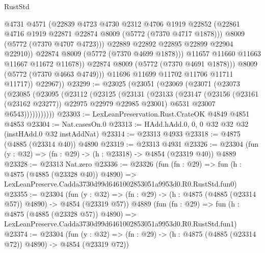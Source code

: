 \begin{lexlean}{RustStd}
\begin{coremodule}
                          @4731
                          @4571
                          (@22839
                            @4723
                            @4730
                            @2312
                            @4706
                            @1919
                            @22852
                            (@22861 @4716 @1919 @22871 @22874 @8009 (@5772 (@7370 @4717 @1878)))
                            @8009
                            (@5772 (@7370 @4707 @4723)))
                          @22889
                          @22892
                          @22895
                          @22899
                          @22904
                          @22910))
                      @22874
                      @8009
                      (@5772 (@7370 @4699 @1878)))
                    @11657
                    @11660
                    @11663
                    @11667
                    @11672
                    @11678))
                @22874
                @8009
                (@5772 (@7370 @4691 @1878)))
              @8009
              (@5772 (@7370 @4663 @4749)))
            @11696
            @11699
            @11702
            @11706
            @11711
            @11717))
        @22967))
@23299 := @23025
    (@23051
      (@23069
        (@23071
          (@23073
            (@23085
              (@23095
                (@23112
                  (@23125
                    (@23131
                      (@23133
                        (@23147
                          (@23156 (@23161 (@23162 @23277)) @22975 @22979 @22985 @23001)
                          @6531
                          @23007
                          @6543)))))))))))
@23303 := LexLeanPreservation.Rust.CrateOK @4849 @4851 @4853
@23304 := Nat.casesOn.{0}
@23313 := HAdd.hAdd.{0, 0, 0} @32 @32 @32 (instHAdd.{0} @32 instAddNat)
@23314 := @23313 @4933
@23318 := @4875 (@4885 (@23314 @40)) @4890
@23319 := @23313 @4931
@23326 := @23304 (fun (y : @32) => (fn : @29) -> (h : @23318) -> @4854 (@23319 @40)) @4889
@23328 := @23313 Nat.zero
@23336 := @23326
    (fun (fn : @29) =>
    fun (h : @4875 (@4885 (@23328 @40)) @4890) =>
    LexLeanPreserve.Cadda3730d99d6461002853051a9953d0.R0.RustStd.fun0)
@23355 := @23304
    (fun (y : @32) => (fn : @29) -> (h : @4875 (@4885 (@23314 @57)) @4890) -> @4854 (@23319 @57))
    @4889
    (fun (fn : @29) =>
    fun (h : @4875 (@4885 (@23328 @57)) @4890) =>
    LexLeanPreserve.Cadda3730d99d6461002853051a9953d0.R0.RustStd.fun1)
@23374 := @23304
    (fun (y : @32) => (fn : @29) -> (h : @4875 (@4885 (@23314 @72)) @4890) -> @4854 (@23319 @72))

\end{coremodule}
\end{lexlean}
